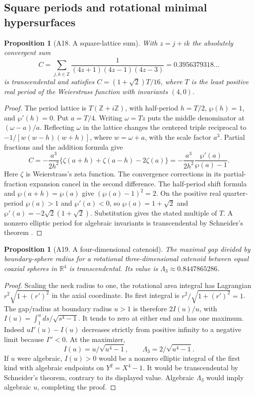 \documentclass[11pt,a4paper]{article}
\newtheorem{proposition}[theorem]{Proposition}
\theoremstyle{definition}
\theoremstyle{remark}
\begin{document}
\subsection{Square periods and rotational minimal hypersurfaces}
\par\hypertarget{cat-A18}{}\label{page:A18}
\begin{proposition}[A18. A square-lattice sum]
With $z=j+ik$ the absolutely convergent sum
\[
 C=\sum_{j,k\in\mathbb Z}
   \frac{1}{(4z+1)(4z-1)(4z-3)}
   =0.3956379318\ldots
\]
is transcendental and satisfies
$C=(1+\sqrt2)T/16$, where $T$ is the least positive real period of the
Weierstrass function with invariants $(4,0)$.
\end{proposition}
\begin{proof}
The period lattice is $T(\mathbb Z+i\mathbb Z)$, with half-period
$h=T/2$, $\wp(h)=1$, and $\wp'(h)=0$. Put $a=T/4$. Writing $\omega=Tz$ puts the middle denominator at $(\omega-a)/a$.
Reflecting $\omega$ in the lattice changes the centered triple reciprocal
to $-1/[w(w-h)(w+h)]$, where $w=\omega+a$, with the scale factor $a^3$.
Partial fractions and the addition formula give
\[
 C=-\frac{a^3}{2h^2}\{\zeta(a+h)+\zeta(a-h)-2\zeta(a)\}
   =-\frac{a^3}{2h^2}\frac{\wp'(a)}{\wp(a)-1}.
\]
Here $\zeta$ is Weierstrass's zeta function. The convergence corrections
in its partial-fraction expansion cancel in the second difference.
The half-period shift formula and $\wp(a+h)=\wp(a)$ give
$(\wp(a)-1)^2=2$. On the positive real quarter-period $\wp(a)>1$ and
$\wp'(a)<0$, so $\wp(a)=1+\sqrt2$ and
$\wp'(a)=-2\sqrt2(1+\sqrt2)$. Substitution gives the stated multiple
of $T$. A nonzero elliptic period for algebraic invariants is
transcendental by Schneider's theorem \cite{aSch,aWald}.
\end{proof}

\par\hypertarget{cat-A19}{}\label{page:A19}
\begin{proposition}[A19. A four-dimensional catenoid]
The maximal gap divided by boundary-sphere radius for a rotational
three-dimensional catenoid between equal coaxial spheres in
$\mathbb R^4$ is transcendental. Its value is
$\Lambda_3\approx0.8447865286$.
\end{proposition}
\begin{proof}
Scaling the neck radius to one, the rotational area integral has
Lagrangian $r^2\sqrt{1+(r')^2}$ in the axial coordinate. Its first
integral is $r^2/\sqrt{1+(r')^2}=1$. The gap/radius at boundary radius
$u>1$ is therefore $2I(u)/u$, with
$I(u)=\int_1^u ds/\sqrt{s^4-1}$. It tends to zero at either end and
has one maximum. Indeed $uI'(u)-I(u)$ decreases strictly from positive
infinity to a negative limit because $I''<0$. At the maximizer,
\[
 I(u)=u/\sqrt{u^4-1},\qquad \Lambda_3=2/\sqrt{u^4-1}.
\]
If $u$ were algebraic, $I(u)>0$ would be a nonzero elliptic integral
of the first kind with algebraic endpoints on $Y^2=X^4-1$. It would
be transcendental by Schneider's theorem, contrary to its displayed
value. Algebraic $\Lambda_3$ would imply algebraic $u$, completing
the proof.
\end{proof}
\end{document}
